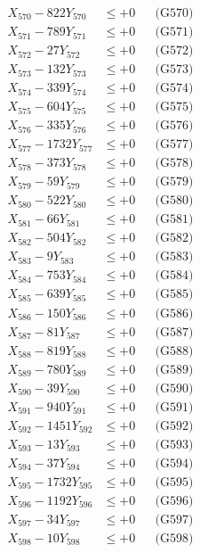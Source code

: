 \documentclass[a4paper,10pt]{article}
\begin{document}
{\begin{align}
X_{570} - 822Y_{570} &\leq +0 && \text{(G570)} \\
\allowbreak
X_{571} - 789Y_{571} &\leq +0 && \text{(G571)} \\
X_{572} - 27Y_{572} &\leq +0 && \text{(G572)} \\
X_{573} - 132Y_{573} &\leq +0 && \text{(G573)} \\
X_{574} - 339Y_{574} &\leq +0 && \text{(G574)} \\
X_{575} - 604Y_{575} &\leq +0 && \text{(G575)} \\
X_{576} - 335Y_{576} &\leq +0 && \text{(G576)} \\
X_{577} - 1732Y_{577} &\leq +0 && \text{(G577)} \\
X_{578} - 373Y_{578} &\leq +0 && \text{(G578)} \\
X_{579} - 59Y_{579} &\leq +0 && \text{(G579)} \\
X_{580} - 522Y_{580} &\leq +0 && \text{(G580)} \\
\allowbreak
X_{581} - 66Y_{581} &\leq +0 && \text{(G581)} \\
X_{582} - 504Y_{582} &\leq +0 && \text{(G582)} \\
X_{583} - 9Y_{583} &\leq +0 && \text{(G583)} \\
X_{584} - 753Y_{584} &\leq +0 && \text{(G584)} \\
X_{585} - 639Y_{585} &\leq +0 && \text{(G585)} \\
X_{586} - 150Y_{586} &\leq +0 && \text{(G586)} \\
X_{587} - 81Y_{587} &\leq +0 && \text{(G587)} \\
X_{588} - 819Y_{588} &\leq +0 && \text{(G588)} \\
X_{589} - 780Y_{589} &\leq +0 && \text{(G589)} \\
X_{590} - 39Y_{590} &\leq +0 && \text{(G590)} \\
\allowbreak
X_{591} - 940Y_{591} &\leq +0 && \text{(G591)} \\
X_{592} - 1451Y_{592} &\leq +0 && \text{(G592)} \\
X_{593} - 13Y_{593} &\leq +0 && \text{(G593)} \\
X_{594} - 37Y_{594} &\leq +0 && \text{(G594)} \\
X_{595} - 1732Y_{595} &\leq +0 && \text{(G595)} \\
X_{596} - 1192Y_{596} &\leq +0 && \text{(G596)} \\
X_{597} - 34Y_{597} &\leq +0 && \text{(G597)} \\
X_{598} - 10Y_{598} &\leq +0 && \text{(G598)} \\

\end{align}}
\end{document}
